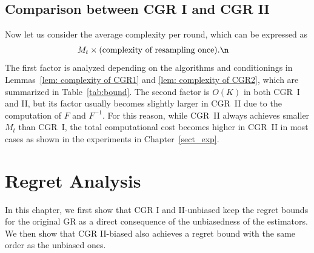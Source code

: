\subsection{Comparison between CGR I and CGR II}
Now let us consider the average complexity per round, which can be expressed as
\begin{align}
&
M_t\times
(\mbox{complexity of resampling once}).
\n
\end{align}
The first factor is analyzed depending on the algorithms and conditionings
in Lemmas~\ref{lem: complexity of CGR1} and \ref{lem: complexity of CGR2}, which are summarized
in Table~\ref{tab:bound}.
The second factor is $O(K)$ in both CGR~I and II,
but its factor usually becomes slightly larger in CGR~II due to the computation of $F$ and $F^{-1}$.
For this reason, while CGR~II always achieves smaller $M_t$ than CGR~I,
the total computational cost becomes higher in CGR~II in most cases
as shown in the experiments in Chapter~\ref{sect_exp}.

\section{Regret Analysis}\label{sect_regret}
In this chapter, we first show that CGR I and II-unbiased keep the regret bounds for the original GR as
a direct consequence of the unbiasedness of the estimators.
We then show that CGR II-biased also achieves a regret bound with the same order as the unbiased ones.

